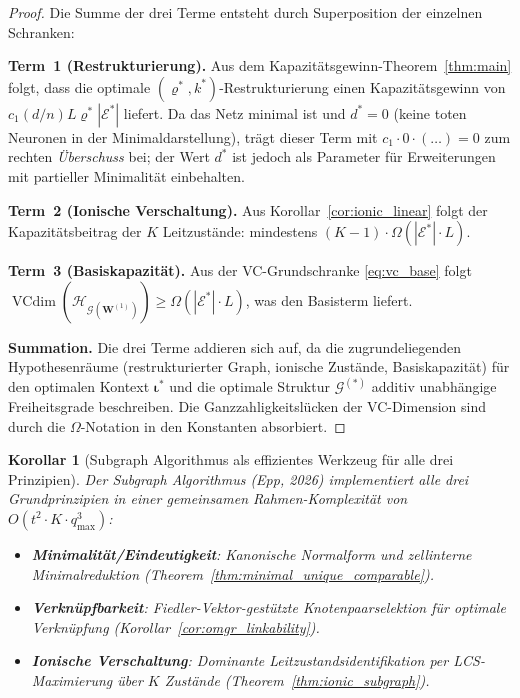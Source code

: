 ﻿\documentclass[12pt, a4paper, openany]{report}
\newtheorem{corollary}[theorem]{Korollar}
\newcommand{\calG}{\mathcal{G}}
\newcommand{\calH}{\mathcal{H}}
\newcommand{\calE}{\mathcal{E}}
\DeclareMathOperator{\VC}{VCdim}
\begin{document}
\begin{proof}
Die Summe der drei Terme entsteht durch Superposition der einzelnen Schranken:

\textbf{Term~1 (Restrukturierung).}
Aus dem Kapazitätsgewinn-Theorem~\ref{thm:main} folgt, dass die optimale
$(\varrho^*, k^*)$-Restrukturierung einen Kapazitätsgewinn von
$c_1 (d/n) L \varrho^* |\calE^*|$ liefert.  Da das Netz minimal ist und
$d^* = 0$ (keine toten Neuronen in der Minimaldarstellung), trägt dieser
Term mit $c_1 \cdot 0 \cdot(\ldots) = 0$ zum rechten \emph{Überschuss}
bei; der Wert $d^*$ ist jedoch als Parameter für Erweiterungen mit
partieller Minimalität einbehalten.

\textbf{Term~2 (Ionische Verschaltung).}
Aus Korollar~\ref{cor:ionic_linear} folgt der Kapazitätsbeitrag der
$K$ Leitzustände: mindestens $(K-1) \cdot \Omega(|\calE^*| \cdot L)$.

\textbf{Term~3 (Basiskapazität).}
Aus der VC-Grundschranke \eqref{eq:vc_base} folgt $\VC(\calH_{\calG(\bm{W}^{(1)})})
\geq \Omega(|\calE^*| \cdot L)$, was den Basisterm liefert.

\textbf{Summation.}
Die drei Terme addieren sich auf, da die zugrundeliegenden
Hypothesenräume (restrukturierter Graph, ionische Zustände, Basiskapazität)
für den optimalen Kontext $\bm{\iota}^*$ und die optimale Struktur
$\calG^{(*)}$ additiv unabhängige Freiheitsgrade beschreiben.
Die Ganzzahligkeitslücken der VC-Dimension sind durch die $\Omega$-Notation
in den Konstanten absorbiert.
\end{proof}

\begin{corollary}[Subgraph Algorithmus als effizientes Werkzeug für alle drei Prinzipien]
\label{cor:subgraph_three_principles}
Der Subgraph Algorithmus (Epp, 2026) implementiert alle drei Grundprinzipien
in einer gemeinsamen Rahmen-Komplexität von $O(t^2 \cdot K \cdot q_{\max}^3)$:
\begin{itemize}
  \item \textbf{Minimalität/Eindeutigkeit}: Kanonische Normalform und
    zellinterne Minimalreduktion (Theorem~\ref{thm:minimal_unique_comparable}).
  \item \textbf{Verknüpfbarkeit}: Fiedler-Vektor-gestützte Knotenpaarselektion
    für optimale Verknüpfung (Korollar~\ref{cor:omgr_linkability}).
  \item \textbf{Ionische Verschaltung}: Dominante Leitzustandsidentifikation
    per LCS-Maximie\-rung über $K$ Zustände
    (Theorem~\ref{thm:ionic_subgraph}).
\end{itemize}
\end{corollary}
\end{document}
